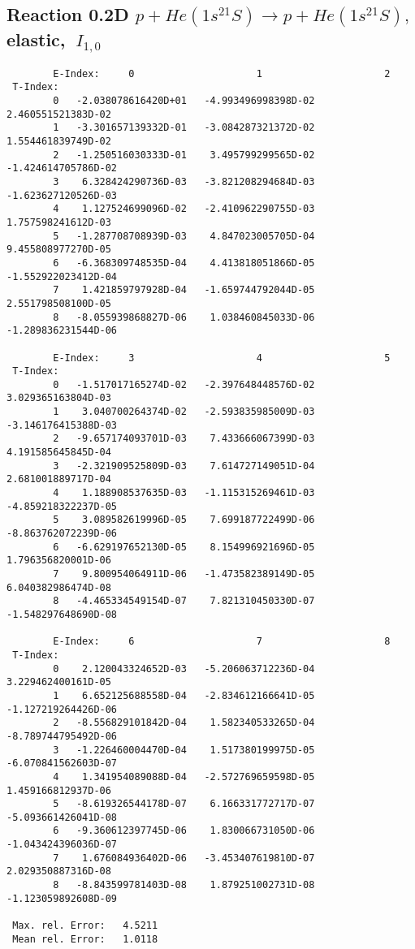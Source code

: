 \documentclass[12pt,dvipdfmx]{article}
\begin{document}
\subsection{
Reaction 0.2D $ p + He(1s^21S) \rightarrow p + He(1s^21S) ,\  $
elastic, $ \  I_{1,0} $
}

\begin{small}\begin{verbatim}
        E-Index:     0                     1                     2
 T-Index:
        0   -2.038078616420D+01   -4.993496998398D-02    2.460551521383D-02
        1   -3.301657139332D-01   -3.084287321372D-02    1.554461839749D-02
        2   -1.250516030333D-01    3.495799299565D-02   -1.424614705786D-02
        3    6.328424290736D-03   -3.821208294684D-03   -1.623627120526D-03
        4    1.127524699096D-02   -2.410962290755D-03    1.757598241612D-03
        5   -1.287708708939D-03    4.847023005705D-04    9.455808977270D-05
        6   -6.368309748535D-04    4.413818051866D-05   -1.552922023412D-04
        7    1.421859797928D-04   -1.659744792044D-05    2.551798508100D-05
        8   -8.055939868827D-06    1.038460845033D-06   -1.289836231544D-06

        E-Index:     3                     4                     5
 T-Index:
        0   -1.517017165274D-02   -2.397648448576D-02    3.029365163804D-03
        1    3.040700264374D-02   -2.593835985009D-03   -3.146176415388D-03
        2   -9.657174093701D-03    7.433666067399D-03    4.191585645845D-04
        3   -2.321909525809D-03    7.614727149051D-04    2.681001889717D-04
        4    1.188908537635D-03   -1.115315269461D-03   -4.859218322237D-05
        5    3.089582619996D-05    7.699187722499D-06   -8.863762072239D-06
        6   -6.629197652130D-05    8.154996921696D-05    1.796356820001D-06
        7    9.800954064911D-06   -1.473582389149D-05    6.040382986474D-08
        8   -4.465334549154D-07    7.821310450330D-07   -1.548297648690D-08

        E-Index:     6                     7                     8
 T-Index:
        0    2.120043324652D-03   -5.206063712236D-04    3.229462400161D-05
        1    6.652125688558D-04   -2.834612166641D-05   -1.127219264426D-06
        2   -8.556829101842D-04    1.582340533265D-04   -8.789744795492D-06
        3   -1.226460004470D-04    1.517380199975D-05   -6.070841562603D-07
        4    1.341954089088D-04   -2.572769659598D-05    1.459166812937D-06
        5   -8.619326544178D-07    6.166331772717D-07   -5.093661426041D-08
        6   -9.360612397745D-06    1.830066731050D-06   -1.043424396036D-07
        7    1.676084936402D-06   -3.453407619810D-07    2.029350887316D-08
        8   -8.843599781403D-08    1.879251002731D-08   -1.123059892608D-09

 Max. rel. Error:   4.5211
 Mean rel. Error:   1.0118
\end{verbatim}\end{small}
\end{document}
